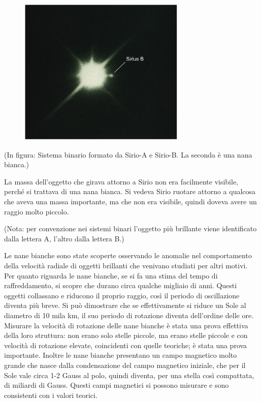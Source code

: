 \begin{figure}[H]
    \centering
    \includegraphics[width=8cm]{lezione 28 novembre/siriob.jpg}
    \label{lezione 28 novembre/nanebianche.png}
\end{figure}

(In figura: Sistema binario formato da Sirio-A e Sirio-B. La seconda è una nana bianca.)

La massa dell'oggetto che girava attorno a Sirio non era facilmente visibile, perché si trattava di una nana bianca. Si vedeva Sirio ruotare attorno a qualcosa che aveva una massa importante, ma che non era visibile, quindi doveva avere un raggio molto piccolo.

(Nota: per convenzione nei sistemi binari l'oggetto più brillante viene identificato dalla lettera A, l'altro dalla lettera B.)

Le nane bianche sono state scoperte osservando le anomalie nel comportamento della velocità radiale di oggetti brillanti che venivano studiati per altri motivi. Per quanto riguarda le nane bianche, se si fa una stima del tempo di raffreddamento, si scopre che durano circa qualche migliaio di anni. Questi oggetti collassano e riducono il proprio raggio, così il periodo di oscillazione diventa più breve. Si può dimostrare che se effettivamente si riduce un Sole al diametro di 10 mila km, il suo periodo di rotazione diventa dell'ordine delle ore. Misurare la velocità di rotazione delle nane bianche è stata una prova effettiva della loro struttura: non erano solo stelle piccole, ma erano stelle piccole e con velocità di rotazione elevate, coincidenti con quelle teoriche; è stata una prova importante. Inoltre le nane bianche presentano un campo magnetico molto grande che nasce dalla condensazione del campo magnetico iniziale, che per il Sole vale circa 1-2 Gauss al polo, quindi diventa, per una stella così compattata, di miliardi di Gauss. Questi campi magnetici si possono misurare e sono consistenti con i valori teorici.

